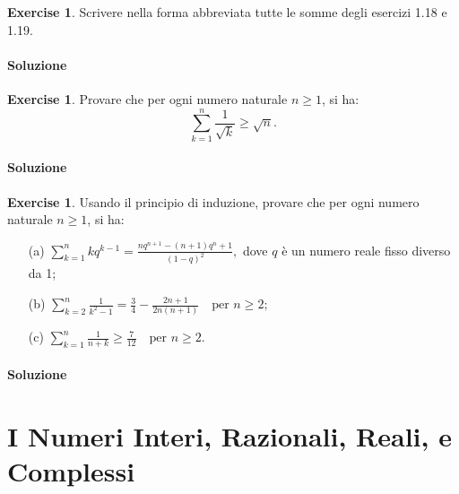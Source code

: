 \documentclass{article}
\theoremstyle{plain}
\theoremstyle{definition}
\newtheorem{xca}[exmp]{Exercise}
\theoremstyle{remark}
\begin{document}
\begin{bxthm}
\begin{xca}
Scrivere nella forma abbreviata tutte le somme degli esercizi 1.18 e 1.19.
\end{xca}
\end{bxthm}
\paragraph{Soluzione}

\begin{bxthm}
\begin{xca}
Provare che per ogni numero naturale $n \ge 1$, si ha:
\[
\sum_{k=1}^n \frac{1}{\sqrt{k}} \ge \sqrt{n}.
\]
\end{xca}
\end{bxthm}
\paragraph{Soluzione}

\begin{bxthm}
\begin{xca}
Usando il principio di induzione, provare che per ogni numero 
naturale $n \ge 1$, si ha:
\begin{itemize}
    \item[(a)] $\displaystyle 
    \sum_{k=1}^n k q^{k-1} = \frac{nq^{n+1} - (n+1)q^n + 1}{(1-q)^2},
    $
    dove $q$ è un numero reale fisso diverso da 1;
    \item[(b)] $\displaystyle 
    \sum_{k=2}^n \frac{1}{k^2 - 1} = \frac{3}{4} - \frac{2n+1}{2n(n+1)}
    \quad \text{per } n \ge 2;
    $
    \item[(c)] $\displaystyle 
    \sum_{k=1}^n \frac{1}{n+k} \ge \frac{7}{12}
    \quad \text{per } n \ge 2.
    $
\end{itemize}
\end{xca}
\end{bxthm}
\paragraph{Soluzione}


\newpage
\section{I Numeri Interi, Razionali, Reali, e Complessi}
\vspace{20pt}

\vspace{10pt}
\end{document}
